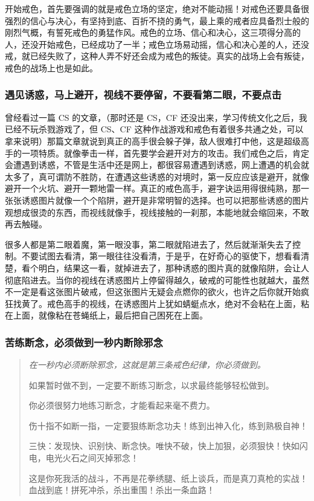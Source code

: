 开始戒色，首先要强调的就是戒色立场的坚定，绝对不能动摇！对戒色还要具备很强烈的信心与决心，有坚持到底、百折不挠的勇气，最上乘的戒者应具备烈士般的刚烈气概，有誓死戒色的勇猛作风。戒色的立场、信心和决心，这三项得分高的人，还没开始戒色，已经成功了一半；戒色立场易动摇，信心和决心差的人，还没戒，就已经失败了，这种人弄不好还会成为戒色的叛徒。真实的战场上会有叛徒，戒色的战场上也是如此。

\subsubsection{遇见诱惑，马上避开，视线不要停留，不要看第二眼，不要点击}

曾经看过一篇 CS 的文章，（那时还是 CS，CF 还没出来，学习传统文化之后，我已经不玩杀戮游戏了，但 CS、CF 这种作战游戏和戒色有着很多共通之处，可以拿来说明）那篇文章就说到真正的高手很会躲子弹，敌人很难打中他，这是超级高手的一项特质。就像拳击一样，首先要学会避开对方的攻击。我们戒色之后，肯定会遭遇到诱惑，不管是生活中还是网上，都很容易遭遇到诱惑，网上遭遇的机会就太多了，真可谓防不胜防，在遭遇这些诱惑的对境时，第一反应应该是避开，就像避开一个火坑、避开一颗地雷一样。真正的戒色高手，避字诀运用得很纯熟，那一张张诱惑图片就像一个个陷阱，避开是非常明智的选择。也可以把那些诱惑的图片观想成很烫的东西，而视线就像手，视线接触的一刹那，本能地就会缩回来，不敢再去触碰。

很多人都是第二眼着魔，第一眼没事，第二眼就陷进去了，然后就渐渐失去了控制。不要试图去看清，第一眼往往没看清，于是乎，在好奇心的驱使下，想看看清楚，看个明白，结果这一看，就掉进去了，那种诱惑的图片真的就像陷阱，会让人彻底陷进去。当你的视线在诱惑图片上停留得越久，破戒的可能性也就越大，虽然不一定是看这张图片破戒，但这张图片无疑会点燃你的欲火，也许之后你就开始疯狂找黄了。戒色高手的视线，在诱惑图片上犹如蜻蜓点水，绝对不会粘在上面，粘在上面，就像粘在苍蝇纸上，最后把自己困死在上面。

\subsubsection{苦练断念，必须做到一秒内断除邪念}

\begin{quotation}\it
    在一秒内必须断除邪念，这就是第三条戒色纪律，你必须做到。

    如果暂时做不到，一定要不断练习断念，以求最终能够轻松做到。

    你必须很努力地练习断念，才能看起来毫不费力。

    伤十指不如断一指，一定要狠练断念功夫！练到出神入化，练到熟极自神！

    三快：发现快、识别快、断念快。唯快不破，快上加狠，必须狠快！快如闪电，电光火石之间灭掉邪念！

    这是你死我活的战斗，不再是花拳绣腿、纸上谈兵，而是真刀真枪的实战！血战到底！拼死冲杀，杀出重围！杀出一条血路！
\end{quotation}

